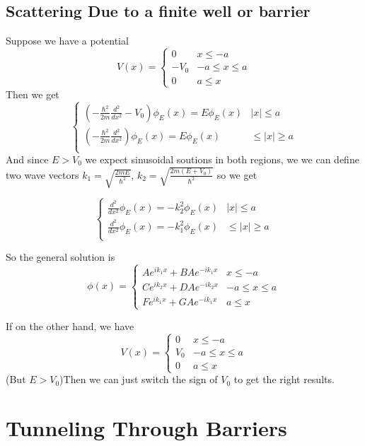 \documentclass{homework}
\begin{document}
\subsection{Scattering Due to a finite well or barrier}
Suppose we have a potential
 \[ V(x) = \begin{cases} 
          0 & x\leq -a \\
         -V_0 & -a \leq x\leq a \\
          0 & a \leq x 
       \end{cases}
    \]
Then we get
 \[ \begin{cases} 
          (-\frac{\hbar^2}{2m}\frac{d^2}{dx^2} - V_0)\phi_E(x) = E\phi_E(x) & |x|\leq a \\
         (-\frac{\hbar^2}{2m}\frac{d^2}{dx^2} )\phi_E(x) = E\phi_E(x) &  \leq |x|\ge a \\
       
       \end{cases}
    \]
And since $E> V_0$ we expect sinusoidal soutions in both regions, we we can define two wave vectors $k_1 = \sqrt{\frac{2mE}{\hbar^2}}$, $k_2 = \sqrt{\frac{2m(E+V_0)}{\hbar^2}}$ so we get

 \[ \begin{cases} 
          \frac{d^2}{dx^2} \phi_E(x) = -k_2^2\phi_E(x) & |x|\leq a \\
         \frac{d^2}{dx^2} \phi_E(x) = -k_1^2\phi_E(x) &  \leq |x|\ge a \\
       
       \end{cases}
    \]

So the general solution is 
 \[ \phi(x) = \begin{cases} 
          Ae^{ik_1x} + BAe^{-ik_1x} & x\leq -a \\
        Ce^{ik_2x} + DAe^{-ik_2x} & -a \leq x\leq a \\
          Fe^{ik_1x} + GAe^{-ik_1x} & a \leq x 
       \end{cases}
    \]



If on the other hand, we have
 \[ V(x) = \begin{cases} 
          0 & x\leq -a \\
         V_0 & -a \leq x\leq a \\
          0 & a \leq x 
       \end{cases}
    \]
(But $E>V_0$)Then we can just switch the sign of $V_0$ to get the right results. 

\section{Tunneling Through Barriers}
\end{document}

